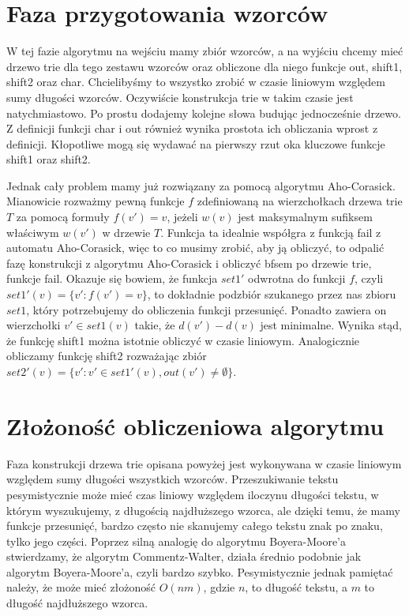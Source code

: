 \documentclass[a4paper,11pt]{article}
\begin{document}
\section{Faza przygotowania wzorców}
W tej fazie algorytmu na wejściu mamy zbiór wzorców, a na wyjściu chcemy mieć drzewo trie dla tego zestawu wzorców oraz obliczone dla niego funkcje out, shift1, shift2 oraz char. Chcielibyśmy to wszystko zrobić w czasie liniowym względem sumy długości wzorców. Oczywiście konstrukcja trie w takim czasie jest natychmiastowo. Po prostu dodajemy kolejne słowa budując jednocześnie drzewo. Z definicji funkcji char i out również wynika prostota ich obliczania wprost z definicji. Kłopotliwe mogą się wydawać na pierwszy rzut oka kluczowe funkcje shift1 oraz shift2.

Jednak cały problem mamy już rozwiązany za pomocą algorytmu Aho-Corasick. Mianowicie rozważmy pewną funkcje $f$ zdefiniowaną na wierzchołkach drzewa trie $T$ za pomocą formuły $f(v') = v$, jeżeli $w(v)$ jest maksymalnym sufiksem właściwym $w(v')$ w drzewie $T$. Funkcja ta idealnie współgra z funkcją fail z automatu Aho-Corasick, więc to co musimy zrobić, aby ją obliczyć, to odpalić fazę konstrukcji z algorytmu Aho-Corasick i obliczyć bfsem po drzewie trie, funkcje fail. Okazuje się bowiem, że funkcja $set1'$ odwrotna do funkcji $f$, czyli $set1'(v) = \{v' : f(v')=v \}$, to dokładnie podzbiór szukanego przez nas zbioru $set1$, który potrzebujemy do obliczenia funkcji przesunięć. Ponadto zawiera on wierzchołki $v' \in set1(v)$ takie, że $d(v')-d(v)$ jest minimalne. Wynika stąd, że funkcję shift1 można istotnie obliczyć w czasie liniowym. Analogicznie obliczamy funkcję shift2 rozważając zbiór $set2'(v) = \{ v' : v' \in set1'(v), out(v') \not = \emptyset\}$. 

\section{Złożoność obliczeniowa algorytmu}
Faza konstrukcji drzewa trie opisana powyżej jest wykonywana w czasie liniowym względem sumy długości wszystkich wzorców. Przeszukiwanie tekstu pesymistycznie może mieć czas liniowy względem iloczynu długości tekstu, w którym wyszukujemy, z długością najdłuższego wzorca, ale dzięki temu, że mamy funkcje przesunięć, bardzo często nie skanujemy całego tekstu znak po znaku, tylko jego części. Poprzez silną analogię do algorytmu Boyera-Moore'a stwierdzamy, że algorytm Commentz-Walter, działa średnio podobnie jak algorytm Boyera-Moore'a, czyli bardzo szybko. Pesymistycznie jednak pamiętać należy, że może mieć złożoność $O(nm)$, gdzie $n$, to długość tekstu, a $m$ to długość najdłuższego wzorca.
\end{document}
